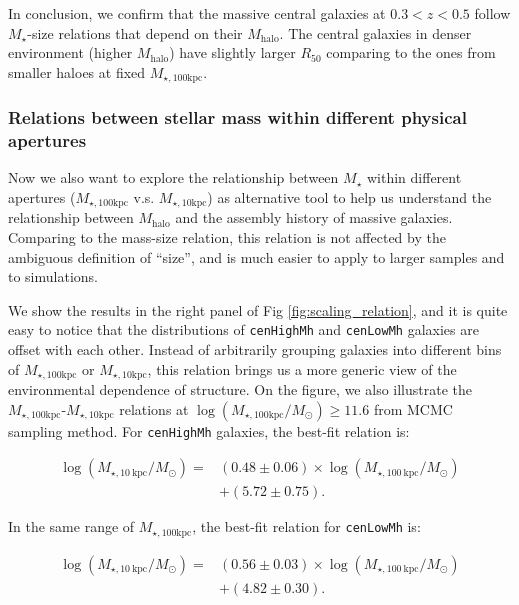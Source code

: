 \documentclass[a4paper,fleqn,usenatbib]{mnras}
\def\rbcg{\texttt{cenHighMh}}
\def\nbcg{\texttt{cenLowMh}}
\def\mstar{{$M_{\star}$}}
\def\mhalo{{$M_{\mathrm{halo}}$}}
\def\minn{{$M_{\star,10\mathrm{kpc}}$}}
\def\mtot{{$M_{\star,100\mathrm{kpc}}$}}
\def\logmtot{{$\log (M_{\star,100\mathrm{kpc}}/M_{\odot})$}}
\begin{document}
    In conclusion, we confirm that the massive central galaxies at $0.3 < z < 0.5$
    follow \mstar{}-size relations that depend on their \mhalo{}. 
    The central galaxies in denser environment (higher \mhalo{}) have slightly 
    larger $R_{\mathrm{50}}$ comparing to the ones from smaller haloes at fixed 
    \mtot{}. 
    
\subsubsection{Relations between stellar mass within different physical apertures}
    \label{sssec:m100_m10}
    
    Now we also want to explore the relationship between \mstar{} within different
    apertures (\mtot{} v.s. \minn{}) as alternative tool to help us understand the 
    relationship between \mhalo{} and the assembly history of massive galaxies.   
    Comparing to the mass-size relation, this relation is not affected by the 
    ambiguous definition of ``size'', and is much easier to apply to larger samples 
    and to simulations. 
     
    We show the results in the right panel of Fig \ref{fig:scaling_relation}, and it 
    is quite easy to notice that the distributions of \rbcg{} and \nbcg{} galaxies 
    are offset with each other.  
    Instead of arbitrarily grouping galaxies into different bins of \mtot{} or 
    \minn{}, this relation brings us a more generic view of the environmental 
    dependence of structure.
    On the figure, we also illustrate the \mtot{}-\minn{} relations at 
    \logmtot$\geq 11.6$ from MCMC sampling method.  
    For \rbcg{} galaxies, the best-fit relation is:
    
    \begin{equation}
        \begin{aligned}
        \log (M_{\star, 10\ \mathrm{kpc}}/M_{\odot}) = & (0.48\pm0.06) \times \log (M_{\star, 100\ \mathrm{kpc}}/M_{\odot}) \\ & +(5.72\pm0.75).
        \end{aligned}
    \end{equation}
    
    \noindent In the same range of \mtot{}, the best-fit relation for \nbcg{} is:
     
    \begin{equation}
        \begin{aligned}
        \log (M_{\star, 10\ \mathrm{kpc}}/M_{\odot}) = & (0.56\pm0.03) \times \log (M_{\star, 100\ \mathrm{kpc}}/M_{\odot}) \\ & +(4.82\pm0.30).
        \end{aligned}
    \end{equation}
     
\end{document}
